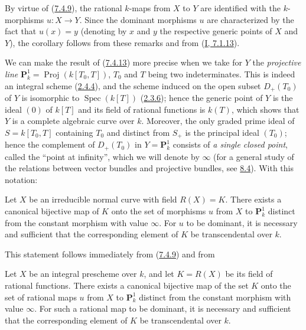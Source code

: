 By virtue of (\hyperref[II.7.4.9]{7.4.9}), the rational $k$-maps
from $X$ to $Y$ are identified with the $k$-morphisms $u:X\to Y$. Since the
dominant morphisms $u$ are characterized by the fact that $u(x)=y$ (denoting by
$x$ and $y$ the respective generic points of $X$ and $Y$), the corollary
follows from these remarks and from (\hyperref[I.7.1.13]{I, 7.1.13}).

\begin{env}[7.4.14]
\label{II.7.4.14}
We can make the result of (\hyperref[II.7.4.13]{7.4.13}) more precise when we
take for $Y$ the \emph{projective line}
$\mathbf{P}_k^1=\operatorname{Proj}(k[T_0,T])$, $T_0$ and $T$ being two
indeterminates. This is indeed an integral scheme
(\hyperref[II.2.4.4]{2.4.4}), and the scheme induced on the open subset
$D_+(T_0)$ of $Y$ is isomorphic to $\operatorname{Spec}(k[T])$
(\hyperref[II.2.3.6]{2.3.6}); hence the generic point of $Y$ is the ideal
$(0)$ of $k[T]$ and its field of rational functions is $k(T)$, which shows
that $Y$ is a complete algebraic curve over $k$. Moreover, the only graded
prime ideal of $S=k[T_0,T]$ containing $T_0$ and distinct from $S_+$ is
the principal ideal $(T_0)$; hence the complement of $D_+(T_0)$ in
$Y=\mathbf{P}_k^1$ consists of \emph{a single closed point}, called the
``point at infinity'', which we will denote by $\infty$ (for a general study
of the relations between vector bundles and projective bundles, see
\hyperref[subsection:II.8.4]{8.4}). With this notation:
\end{env}

\begin{corollary}[7.4.15]
\label{II.7.4.15}
Let $X$ be an irreducible normal curve with field $R(X)=K$. There exists a
canonical bijective map of $K$ onto the set of morphisms $u$ from
$X$ to $\mathbf{P}_k^1$ distinct from the constant morphism with value
$\infty$. For $u$ to be dominant, it is necessary and sufficient that the
corresponding element of $K$ be transcendental over $k$.
\end{corollary}

This statement follows immediately from (\hyperref[II.7.4.9]{7.4.9}) and
from

\begin{lemma}[7.4.15.1]
\label{II.7.4.15.1}
Let $X$ be an integral prescheme over $k$, and let $K=R(X)$ be its field of
rational functions. There exists a canonical bijective map of the set
$K$ onto the set of rational maps $u$ from $X$ to
$\mathbf{P}_k^1$ distinct from the constant morphism with value $\infty$. For
such a rational map to be dominant, it is necessary and sufficient that the
corresponding element of $K$ be transcendental over $k$.
\end{lemma}

